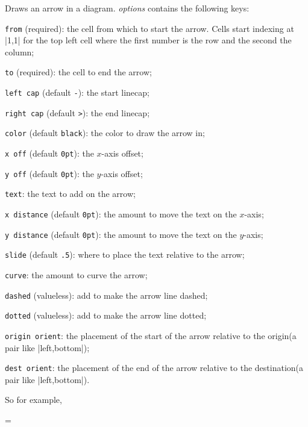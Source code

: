 Draws an arrow in a \macro\drawdiagram{} diagram.
{\it options} contains the following keys:
\blist
    \item {\tt from} (required): the cell from which to start the arrow.
        Cells start indexing at \inlinecode|{1,1}| for the top left cell where the first number is the row and the second the column;
    \item {\tt to} (required): the cell to end the arrow;
    \item {\tt left cap} (default {\tt-}): the start linecap;
    \item {\tt right cap} (default {\tt>}): the end linecap;
    \item {\tt color} (default {\tt black}): the color to draw the arrow in;
    \item {\tt x off} (default {\tt0pt}): the $x$-axis offset;
    \item {\tt y off} (default {\tt0pt}): the $y$-axis offset;
    \item {\tt text}: the text to add on the arrow;
    \item {\tt x distance} (default {\tt0pt}): the amount to move the text on the $x$-axis;
    \item {\tt y distance} (default {\tt0pt}): the amount to move the text on the $y$-axis;
    \item {\tt slide} (default {\tt.5}): where to place the text relative to the arrow;
    \item {\tt curve}: the amount to curve the arrow;
    \item {\tt dashed} (valueless): add to make the arrow line dashed;
    \item {\tt dotted} (valueless): add to make the arrow line dotted;
    \item {\tt origin orient}: the placement of the start of the arrow relative to the origin\hfill\break (a pair like \inlinecode|{left,bottom}|);
    \item {\tt dest orient}: the placement of the end of the arrow relative to the destination\hfill\break (a pair like \inlinecode|{left,bottom}|).
\elist
\emacroexp

So for example, 

\bgroup\parindent=\z@
\blisting
{}
\elisting
\egroup


